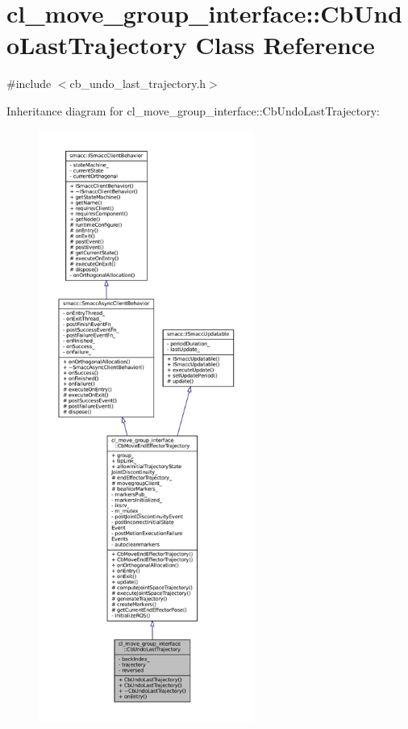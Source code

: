 \hypertarget{classcl__move__group__interface_1_1CbUndoLastTrajectory}{}\section{cl\+\_\+move\+\_\+group\+\_\+interface\+:\+:Cb\+Undo\+Last\+Trajectory Class Reference}
\label{classcl__move__group__interface_1_1CbUndoLastTrajectory}


{\ttfamily \#include $<$cb\+\_\+undo\+\_\+last\+\_\+trajectory.\+h$>$}



Inheritance diagram for cl\+\_\+move\+\_\+group\+\_\+interface\+:\+:Cb\+Undo\+Last\+Trajectory\+:
\nopagebreak
\begin{figure}[H]
\begin{center}
\leavevmode
\includegraphics[height=550pt]{classcl__move__group__interface_1_1CbUndoLastTrajectory__inherit__graph}
\end{center}
\end{figure}


